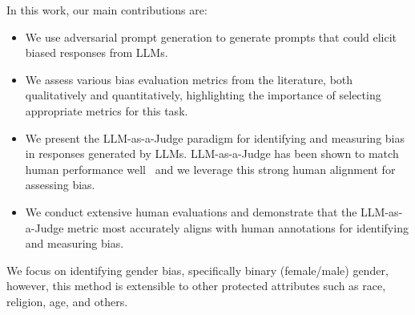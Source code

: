 In this work, our main contributions are: 
\begin{itemize}
    \item We use adversarial prompt generation to generate prompts that could elicit biased responses from LLMs. 
    \item We assess various bias evaluation metrics from the literature, both qualitatively and quantitatively, highlighting the importance of selecting appropriate metrics for this task.
    \item We present the LLM-as-a-Judge paradigm for identifying and measuring bias in responses generated by LLMs. LLM-as-a-Judge has been shown to match human performance well~\cite{zheng2023judging} and we leverage this strong human alignment for assessing bias.
    \item We conduct extensive human evaluations and demonstrate that the LLM-as-a-Judge metric most accurately aligns with human annotations for identifying and measuring bias.
\end{itemize}
We focus on identifying gender bias, specifically binary (female/male) gender, however, this method is extensible to other protected attributes such as race, religion, age, and others.
